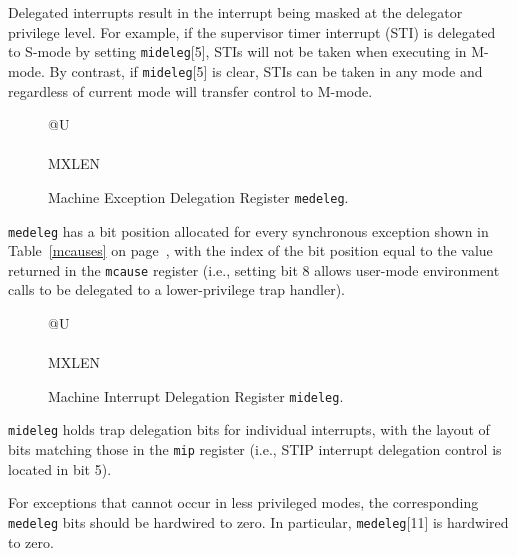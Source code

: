 Delegated interrupts result in the interrupt being masked at the delegator
privilege level.  For example, if the supervisor timer interrupt (STI) is
delegated to S-mode by setting {\tt mideleg}[5], STIs will not be taken when
executing in M-mode.  By contrast, if {\tt mideleg}[5] is clear, STIs can
be taken in any mode and regardless of current mode will transfer control to
M-mode.

\begin{figure}[h!]
{\footnotesize
\begin{center}
\begin{tabular}{@{}U}
 \\
\hline
{} \\
\hline
MXLEN \\
\end{tabular}
\end{center}
}
\vspace{-0.1in}
\caption{Machine Exception Delegation Register {\tt medeleg}.}
\label{medelegreg}
\end{figure}

{\tt medeleg} has a bit position allocated for every synchronous exception
shown in Table~\ref{mcauses} on page~\pageref{mcauses}, with the index of the bit position equal to the
value returned in the {\tt mcause} register (i.e., setting bit 8 allows
user-mode environment calls to be delegated to a lower-privilege trap
handler).

\begin{figure}[h!]
{\footnotesize
\begin{center}
\begin{tabular}{@{}U}
 \\
\hline
{} \\
\hline
MXLEN \\
\end{tabular}
\end{center}
}
\vspace{-0.1in}
\caption{Machine Interrupt Delegation Register {\tt mideleg}.}
\label{midelegreg}
\end{figure}

{\tt mideleg} holds trap delegation bits for individual interrupts, with the
layout of bits matching those in the {\tt mip} register (i.e., STIP interrupt
delegation control is located in bit 5).

For exceptions that cannot occur in less privileged modes, the corresponding
{\tt medeleg} bits should be hardwired to zero.  In particular,
{\tt medeleg}[11] is hardwired to zero.

